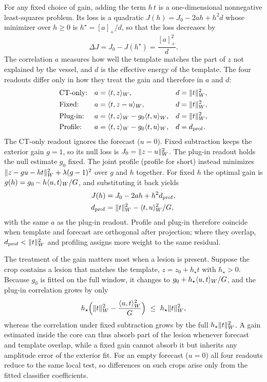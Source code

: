 For any fixed choice of gain, adding the term $h\,t$ is a one-dimensional nonnegative least-squares problem. Its loss is a quadratic $J(h)=J_0-2ah+h^2d$ whose minimizer over $h\ge0$ is $h^\star=[a]_+/d$, so that the loss decreases by
\begin{equation}
\Delta J=J_0-J(h^\star)=\frac{[a]_+^2}{d}.
\label{eq:reduction}
\end{equation}
The correlation $a$ measures how well the template matches the part of $z$ not explained by the vessel, and $d$ is the effective energy of the template. The four readouts differ only in how they treat the gain and therefore in $a$ and $d$:
\begin{equation}
\begin{aligned}
&\text{CT-only:} && a=\langle t,z\rangle_W, && d=\|t\|_W^2,\\
&\text{Fixed:} && a=\langle t,z-u\rangle_W, && d=\|t\|_W^2,\\
&\text{Plug-in:} && a=\langle t,z\rangle_W-g_0\langle t,u\rangle_W, && d=\|t\|_W^2,\\
&\text{Profile:} && a=\langle t,z\rangle_W-g_0\langle t,u\rangle_W, && d=d_{\rm prof}.
\end{aligned}
\label{eq:readouts}
\end{equation}
The CT-only readout ignores the forecast ($u=0$). Fixed subtraction keeps the exterior gain $g=1$, so its null loss is $J_0=\|z-u\|_W^2$. The plug-in readout holds the null estimate $g_0$ fixed. The joint profile (profile for short) instead minimizes $\|z-gu-ht\|_W^2+\lambda(g-1)^2$ over $g$ and $h$ together. For fixed $h$ the optimal gain is $g(h)=g_0-h\langle u,t\rangle_W/G$, and substituting it back yields
\begin{equation}
\begin{aligned}
J(h)&=J_0-2ah+h^2d_{\rm prof},\\
d_{\rm prof}&=\|t\|_W^2-\langle t,u\rangle_W^2/G,
\end{aligned}
\label{eq:profile}
\end{equation}
with the same $a$ as the plug-in readout. Profile and plug-in therefore coincide when template and forecast are orthogonal after projection; where they overlap, $d_{\rm prof}<\|t\|_W^2$ and profiling assigns more weight to the same residual.

The treatment of the gain matters most when a lesion is present. Suppose the crop contains a lesion that matches the template, $z=z_0+h_\star t$ with $h_\star>0$. Because $g_0$ is fitted on the full window, it changes to $g_0+h_\star\langle u,t\rangle_W/G$, and the plug-in correlation grows by only
\begin{equation}
h_\star\Bigl(\nrm{t}^2-\frac{\ip{u}{t}^2}{G}\Bigr)\ \le\ h_\star\nrm{t}^2 ,
\label{eq:absorb}
\end{equation}
whereas the correlation under fixed subtraction grows by the full $h_\star\|t\|_W^2$. A gain estimated inside the core can thus absorb part of the lesion whenever forecast and template overlap, while a fixed gain cannot absorb it but inherits any amplitude error of the exterior fit. For an empty forecast ($u=0$) all four readouts reduce to the same local test, so differences on such crops arise only from the fitted classifier coefficients.

